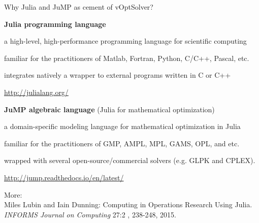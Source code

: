 \documentclass[10pt,xcolor=dvipsnames]{beamer}
\begin{document}
\begin{frame}{Why Julia and JuMP as cement of vOptSolver?}

\textbf{Julia programming language}
\begin{itemize}
\footnotesize{
    \item a high-level, high-performance programming language for scientific computing\vspace{-1mm}
    \item familiar for the practitioners of Matlab, Fortran, Python, C/C++, Pascal, etc.\vspace{-1mm}
    \item integrates natively a wrapper to external programs written in C or C++ \vspace{-1mm}
    \item  \url{http://julialang.org/}
}
\end{itemize}

\medskip

\textbf{JuMP algebraic language} (Julia for mathematical optimization)
\begin{itemize}
\footnotesize{
    \item a domain-specific modeling language for mathematical optimization in Julia\vspace{-1mm}
    \item familiar for the practitioners of GMP, AMPL, MPL, GAMS, OPL, and etc.\vspace{-1mm}
    \item wrapped with several open-source/commercial solvers (e.g. GLPK and CPLEX).\vspace{-1mm}
    \item  \url{http://jump.readthedocs.io/en/latest/}
    }
\end{itemize}

\medskip

More:\\
\footnotesize{
Miles Lubin and Iain Dunning:
Computing in Operations Research Using Julia.
\textit{INFORMS Journal on Computing} 27:2 , 238-248, 2015.}
    
\end{frame}



\end{document}
